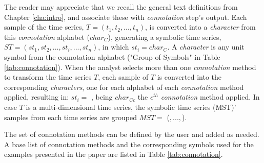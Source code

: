 The reader may appreciate that we recall the general text definitions from Chapter \ref{cha:intro}, and associate these with \textit{connotation} step's output. Each sample of the time series, $T=(t_1, t_2, ..., t_n)$,  is converted into a \textit{character} from this \textit{connotation} alphabet ($char_C$), generating a symbolic time series, $ST = (st_1, st_2, ..., st_i, ..., st_n)$, in which $st_i = char_C$. A \textit{character} is any unit symbol from the connotation alphabet ("Group of Symbols" in Table \ref{tab:connotation}). When the analyst selects more than one \textit{connotation} method to transform the time series $T$, each sample of $T$ is converted into the corresponding \textit{characters}, one for each alphabet of each \textit{connotation} method applied, resulting in: $st_i =$  , being $ char_{Cc}$ the $c^{th}$ \textit{connotation} method applied. In case $T$ is a multi-dimensional time series, the symbolic time series (MST)' samples from each time series are grouped $MST =$ ($,..., $).
\par
The set of connotation methods can be defined by the user and added as needed. A base list of connotation methods and the corresponding symbols used for the examples presented in the paper are listed in Table \ref{tab:connotation}.

